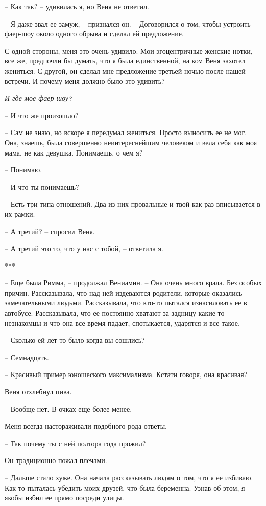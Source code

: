\documentclass[
]{book}
\begin{document}
-- Как так? -- удивилась я, но Веня не ответил.

-- Я даже звал ее замуж, -- признался он. -- Договорился о том, чтобы устроить фаер-шоу около одного обрыва и сделал ей предложение.

С одной стороны, меня это очень удивило. Мои эгоцентричные женские нотки, все же, предпочли бы думать, что я была единственной, на ком Веня захотел жениться. С другой, он сделал мне предложение третьей ночью после нашей встречи. И почему меня должно было это удивить?

\emph{И где мое фаер-шоу?}

-- И что же произошло?

-- Сам не знаю, но вскоре я передумал жениться. Просто выносить ее не мог. Она, знаешь, была совершенно неинтереснейшим человеком и вела себя как моя мама, не как девушка. Понимаешь, о чем я?

-- Понимаю.

-- И что ты понимаешь?

-- Есть три типа отношений. Два из них провальные и твой как раз вписывается в их рамки.

-- А третий? -- спросил Веня.

-- А третий это то, что у нас с тобой, -- ответила я.

***

-- Еще была Римма, -- продолжал Вениамин. -- Она очень много врала. Без особых причин. Рассказывала, что над ней издеваются родители, которые оказались замечательными людьми. Рассказывала, что кто-то пытался изнасиловать ее в автобусе. Рассказывала, что ее постоянно хватают за задницу какие-то незнакомцы и что она все время падает, спотыкается, ударятся и все такое.

-- Сколько ей лет-то было когда вы сошлись?

-- Семнадцать.

-- Красивый пример юношеского максимализма. Кстати говоря, она красивая?

Веня отхлебнул пива.

-- Вообще нет. В очках еще более-менее.

Меня всегда настораживали подобного рода ответы.

-- Так почему ты с ней полтора года прожил?

Он традиционно пожал плечами.

-- Дальше стало хуже. Она начала рассказывать людям о том, что я ее избиваю. Как-то пыталась убедить моих друзей, что была беременна. Узнав об этом, я якобы избил ее прямо посреди улицы.
\end{document}
